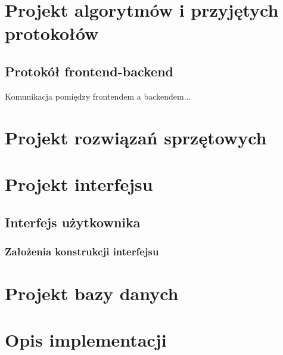\section{Projekt algorytmów i przyjętych protokołów}

\subsection{Protokół frontend-backend}
Komunikacja pomiędzy frontendem a backendem...

\section{Projekt rozwiązań sprzętowych}

\section{Projekt interfejsu}

\subsection{Interfejs użytkownika}

\subsubsection{Założenia konstrukcji interfejsu}

\section{Projekt bazy danych}

\section{Opis implementacji}
